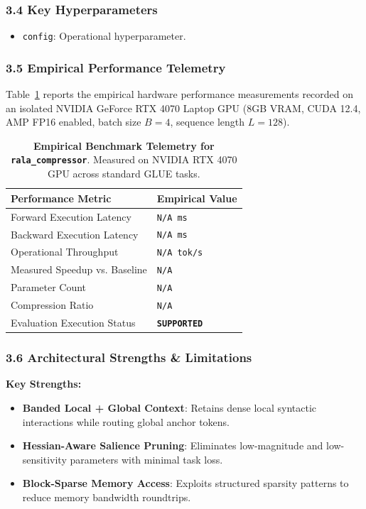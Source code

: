 \subsubsection*{3.4 Key Hyperparameters}
\begin{itemize}
    \item \texttt{config}: Operational hyperparameter.
\end{itemize}

\subsubsection*{3.5 Empirical Performance Telemetry}
Table~\ref{tab:telemetry_rala_compressor} reports the empirical hardware performance measurements recorded on an isolated NVIDIA GeForce RTX 4070 Laptop GPU (8GB VRAM, CUDA 12.4, AMP FP16 enabled, batch size $B=4$, sequence length $L=128$).

\begin{table}[h]
\centering
\small
\caption{\textbf{Empirical Benchmark Telemetry for \texttt{rala\_compressor}}. Measured on NVIDIA RTX 4070 GPU across standard GLUE tasks.}
\label{tab:telemetry_rala_compressor}
\begin{tabularx}{\columnwidth}{lX}
\toprule
\textbf{Performance Metric} & \textbf{Empirical Value} \\
\midrule
Forward Execution Latency & \texttt{N/A ms} \\
Backward Execution Latency & \texttt{N/A ms} \\
Operational Throughput & \texttt{N/A tok/s} \\
Measured Speedup vs. Baseline & \texttt{N/A} \\
Parameter Count & \texttt{N/A} \\
Compression Ratio & \texttt{N/A} \\
Evaluation Execution Status & \textbf{\texttt{SUPPORTED}} \\
\bottomrule
\end{tabularx}
\end{table}

\subsubsection*{3.6 Architectural Strengths \& Limitations}
\textbf{Key Strengths:}
\begin{itemize}
    \item \textbf{Banded Local + Global Context}: Retains dense local syntactic interactions while routing global anchor tokens.
    \item \textbf{Hessian-Aware Salience Pruning}: Eliminates low-magnitude and low-sensitivity parameters with minimal task loss.
    \item \textbf{Block-Sparse Memory Access}: Exploits structured sparsity patterns to reduce memory bandwidth roundtrips.
\end{itemize}

